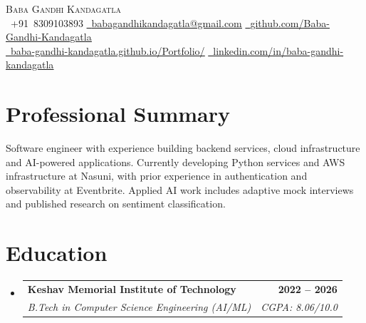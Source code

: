 \documentclass[letterpaper,10pt]{article}
\makeatletter
\newcommand{\resumeSubheading}[4]{%
  \vspace{-1pt}\item%
    \begin{tabular*}{1.0\textwidth}[t]{l@{\extracolsep{\fill}}r}%
      \textbf{#1} & \textbf{\footnotesize #2} \\%
      \textit{\footnotesize #3} & \textit{\footnotesize #4} \\%
    \end{tabular*}\vspace{-2pt}%
}
\newcommand{\resumeSubHeadingListStart}{\begin{itemize}[leftmargin=0in, label={}, itemsep=0pt, topsep=0pt]}
\newcommand{\resumeSubHeadingListEnd}{\end{itemize}}
\makeatother
\begin{document}
\begin{center}
    {\Huge \scshape Baba Gandhi Kandagatla} \\ \vspace{1pt}
    \footnotesize
    \raisebox{-0.1\height}\faPhone\ +91~8309103893 \quad
    \href{mailto:babagandhikandagatla@gmail.com}{\raisebox{-0.2\height}\faEnvelope\ \underline{babagandhikandagatla@gmail.com}} \quad
    \href{https://github.com/Baba-Gandhi-Kandagatla}{\raisebox{-0.2\height}\faGithub\ \underline{github.com/Baba-Gandhi-Kandagatla}} \\[3pt]
    \href{https://baba-gandhi-kandagatla.github.io/Portfolio/}{\raisebox{-0.2\height}\faGlobe\ \underline{baba-gandhi-kandagatla.github.io/Portfolio/}} \quad
    \href{https://www.linkedin.com/in/baba-gandhi-kandagatla/}{\raisebox{-0.2\height}\faLinkedin\ \underline{linkedin.com/in/baba-gandhi-kandagatla}}
\end{center}

\section{Professional Summary}
\footnotesize Software engineer with experience building backend services, cloud infrastructure and AI-powered applications. Currently developing Python services and AWS infrastructure at Nasuni, with prior experience in authentication and observability at Eventbrite. Applied AI work includes adaptive mock interviews and published research on sentiment classification.
 \vspace{-.5em}


\section{Education}
\resumeSubHeadingListStart
  \resumeSubheading
      {Keshav Memorial Institute of Technology}{2022 -- 2026}
      {B.Tech in Computer Science Engineering (AI/ML)}{CGPA: 8.06/10.0}
\resumeSubHeadingListEnd
\vspace{-.5em}
\end{document}
